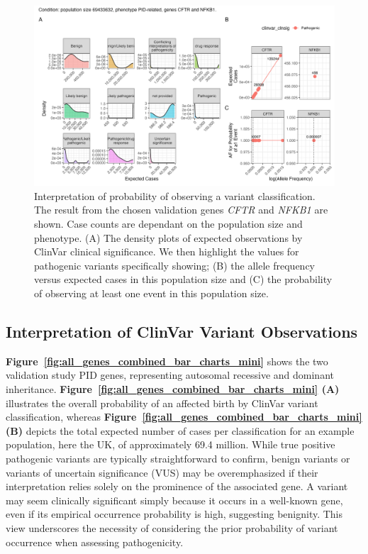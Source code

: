 \begin{figure}[ht]
  \centering
  \includegraphics[width=\textwidth]{../images/validation_studies_scatterdense_expected_prob.png}
  \caption{Interpretation of probability of observing a variant classification. 
 The result from the chosen validation genes \textit{CFTR} and \textit{NFKB1} are shown. 
 Case counts are dependant on the population size and phenotype.
(A) The density plots of expected observations by ClinVar clinical significance. 
We then highlight the values for pathogenic variants specifically showing;
(B) the allele frequency versus expected cases in this population size and
(C) the probability of observing at least one event in this population size.}
  \label{fig:validation_scatter_dense}
\end{figure}

\subsection{Interpretation of ClinVar Variant Observations}

\textbf{Figure~\ref{fig:all_genes_combined_bar_charts_mini}} shows  the two validation study PID genes, representing autosomal recessive and dominant inheritance. \textbf{Figure~\ref{fig:all_genes_combined_bar_charts_mini} (A)}   illustrates the overall probability of an affected birth by ClinVar variant classification, whereas \textbf{Figure~\ref{fig:all_genes_combined_bar_charts_mini}  (B)}  depicts the total expected number of cases per classification for an example population, here the UK, of approximately 69.4 million. 
While true positive pathogenic variants are typically straightforward to confirm, benign variants or variants of uncertain significance (VUS) may be overemphasized if their interpretation relies solely on the prominence of the associated gene.
A variant may seem clinically significant simply because it occurs in a well-known gene, even if its empirical occurrence probability is high, suggesting benignity. This view underscores the necessity of considering the prior probability of variant occurrence when assessing pathogenicity.

